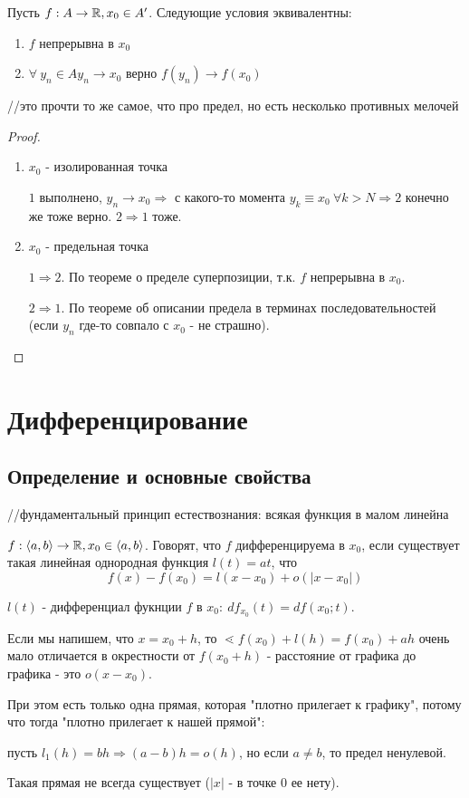 \documentclass[12pt]{report}
\begin{document}
\begin{st}
Пусть $f: A \to \mathbb{R}, x_0 \in A'$. Следующие условия эквивалентны:
\begin{enumerate}
\item $f$ непрерывна в $x_0$
\item $\forall ~y_n \in A y_n \to x_0$ верно $f(y_n) \to f(x_0)$
\end{enumerate}

//это прочти то же самое, что про предел, но есть несколько противных мелочей
\end{st}

\begin{proof}
\begin{enumerate}
\item $x_0$ - изолированная точка

$1$ выполнено, $y_n \to x_0 \Rightarrow$ с какого-то момента $y_k \equiv x_0 ~\forall k > N \Rightarrow 2$ конечно же тоже верно. $2 \Rightarrow 1$ тоже.

\item $x_0$ - предельная точка

$1 \Rightarrow 2$. По теореме о пределе суперпозиции, т.к. $f$ непрерывна в $x_0$.

$2 \Rightarrow 1$. По теореме об описании предела в терминах последовательностей (если $y_n$ где-то совпало с $x_0$ - не страшно).
\end{enumerate}
\end{proof}

\chapter{Дифференцирование}
\section{Определение и основные свойства}

//фундаментальный принцип естествознания: всякая функция в малом линейна

\begin{defn}
$f: \left<a, b\right> \to \mathbb{R}, x_0 \in \left<a, b\right>$. Говорят, что $f$ дифференцируема в $x_0$, если существует такая линейная однородная функция $l(t) = at$, что
$$f(x) - f(x_0) = l(x - x_0) + o(|x - x_0|)$$

$l(t)$ - дифференциал фукнции $f$ в $x_0: ~df_{x_0}(t) = df(x_0; t)$.
\end{defn}

\begin{note}
Если мы напишем, что $x = x_0 + h$, то $\lessdot f(x_0) + l(h) = f(x_0) + ah$ очень мало отличается в окрестности от $f(x_0 + h)$ - расстояние от графика до графика  - это $o(x - x_0)$.

При этом есть только одна прямая, которая "плотно прилегает к графику", потому что тогда "плотно прилегает к нашей прямой":

пусть $l_1(h) = bh \Rightarrow (a - b)h = o(h)$, но если $a \neq b$, то предел ненулевой. 

Такая прямая не всегда существует ($|x|$ - в точке $0$ ее нету).
\end{note}
\end{document}
